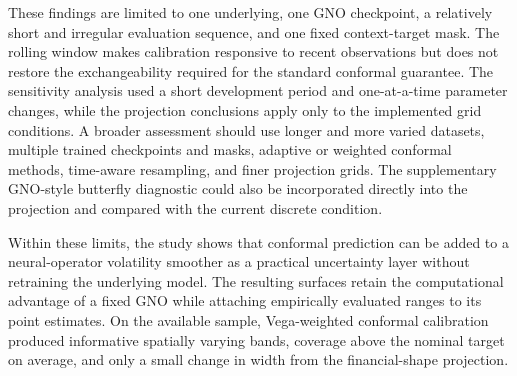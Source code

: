 These findings are limited to one underlying, one GNO checkpoint, a relatively short and irregular evaluation sequence, and one fixed context-target mask. The rolling window makes calibration responsive to recent observations but does not restore the exchangeability required for the standard conformal guarantee. The sensitivity analysis used a short development period and one-at-a-time parameter changes, while the projection conclusions apply only to the implemented grid conditions. A broader assessment should use longer and more varied datasets, multiple trained checkpoints and masks, adaptive or weighted conformal methods, time-aware resampling, and finer projection grids. The supplementary GNO-style butterfly diagnostic could also be incorporated directly into the projection and compared with the current discrete condition.

Within these limits, the study shows that conformal prediction can be added to a neural-operator volatility smoother as a practical uncertainty layer without retraining the underlying model. The resulting surfaces retain the computational advantage of a fixed GNO while attaching empirically evaluated ranges to its point estimates. On the available sample, Vega-weighted conformal calibration produced informative spatially varying bands, coverage above the nominal target on average, and only a small change in width from the financial-shape projection.

